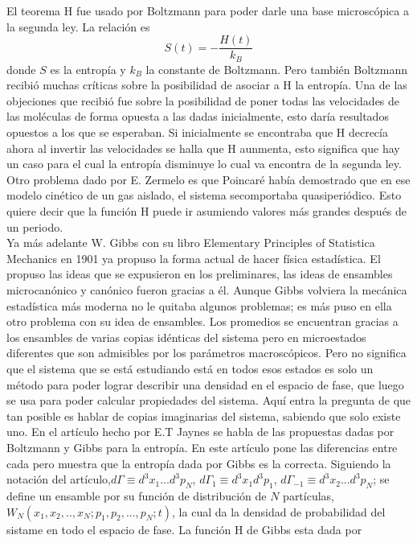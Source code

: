 El teorema H fue usado por Boltzmann para poder darle una base microscópica a la segunda ley. La relación es 
\begin{equation}
S(t)=- \frac{H(t)}{k_{B}}
\end{equation}
donde $S$ es la entropía y $k_{B}$ la constante de Boltzmann. Pero también Boltzmann recibió muchas críticas sobre  la posibilidad de asociar a H la entropía. Una de las objeciones que recibió fue sobre la posibilidad de poner todas las velocidades de las moléculas de forma opuesta a las dadas inicialmente, esto daría resultados opuestos a los que se esperaban. Si inicialmente se encontraba que H decrecía ahora al invertir las velocidades se halla que H aunmenta, esto significa que hay un caso para el cual la entropía disminuye lo cual va encontra de la segunda ley. Otro problema dado por E. Zermelo es que Poincaré había demostrado que en ese modelo cinético de un gas aislado, el sistema secomportaba quasiperiódico. Esto quiere decir que la función H puede ir asumiendo valores más grandes después de un periodo. 
\\
Ya más adelante W. Gibbs con su libro Elementary Principles of Statistica Mechanics en 1901 ya propuso la forma actual de hacer física estadística. El propuso las ideas que se expusieron en los preliminares, las ideas de ensambles microcanónico y canónico fueron gracias a él. Aunque Gibbs volviera la mecánica estadística más moderna no le quitaba algunos problemas; es más puso en ella otro problema con su idea de ensambles. Los promedios se encuentran gracias a los ensambles de varias copias idénticas del sistema pero en microestados diferentes que son admisibles por los parámetros macroscópicos. Pero no significa que el sistema que se está estudiando está en todos esos estados es solo un método para poder lograr describir una densidad en el espacio de fase, que luego se usa para poder calcular propiedades del sistema. Aquí entra la pregunta de que tan posible es hablar de copias imaginarias del sistema, sabiendo que solo existe uno. En el artículo hecho por E.T Jaynes se habla de las propuestas dadas por Boltzmann y Gibbs para la entropía. En este artículo pone las diferencias entre cada pero muestra que la entropía dada por Gibbs es la correcta. Siguiendo la notación del artículo,$d\Gamma \equiv d^{3}x_{1}...d^{3}p_{N}$, $d\Gamma_{1} \equiv d^{3}x_{1}d^{3}p_{1}$, $d\Gamma_{-1} \equiv d^{3}x_{2}...d^{3}p_{N}$; se define un ensamble por su función de distribución de $N$ partículas,$W_{N}(x_{1},x_{2},..,x_{N};p_{1},p_{2},...,p_{N};t)$, la cual da la densidad de probabilidad del sistame en todo  el espacio de fase. La función H de Gibbs esta dada por
